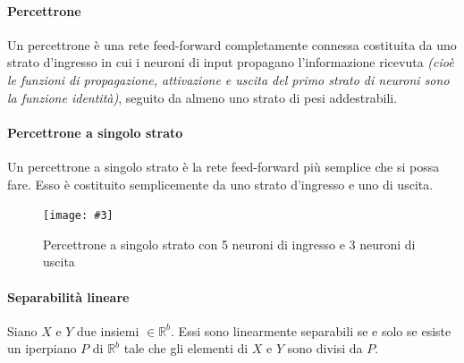 \documentclass[12pt, twoside, letterpaper]{report}
\newcommand{\img}[4] {
	\begin{figure}
		\centering
		\texttt{[image: \#3]}\\
		\caption{#1}
		\label{#4}
	\end{figure}
}
\begin{document}
			\paragraph{Percettrone} Un percettrone è una rete feed-forward completamente connessa costituita da uno strato d'ingresso in cui i neuroni di input propagano l'informazione ricevuta \textit{(cioè le funzioni di propagazione, attivazione e uscita del primo strato di neuroni sono la funzione identità)}, seguito da almeno uno strato di pesi addestrabili.
			
			\paragraph{Percettrone a singolo strato} Un percettrone a singolo strato è la rete feed-forward più semplice che si possa fare. Esso è costituito semplicemente da uno strato d'ingresso e uno di uscita. 
				\img{Percettrone a singolo strato con 5 neuroni di ingresso e 3 neuroni di uscita}{0.5}{slp.png}{slp} 
				
			\paragraph{Separabilità lineare} Siano $X$ e $Y$ due insiemi $\in \mathbb{R}^b$. Essi sono linearmente separabili se e solo se esiste un iperpiano $P$ di $\mathbb{R}^b$ tale che gli elementi di $X$ e $Y$ sono divisi da $P$. 
			
\end{document}
